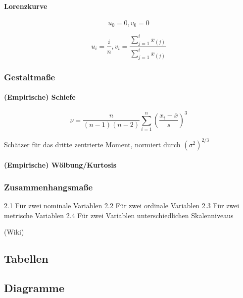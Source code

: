 \documentclass[10pt]{article}
\begin{document}
\begin{multicols}{2}

\paragraph{Lorenzkurve}

$$u_0=0, v_0=0$$

$$u_i=\frac{i}{n}, v_i= \frac{\sum\limits_{j=1}^i x_{(j)}}{\sum\limits_{j=1}^i x_{(j)}}$$


\end{multicols}


\subsubsection{Gestaltmaße}

\begin{multicols}{2}
\paragraph{(Empirische) Schiefe}

$$\nu = \frac{n}{(n-1)(n-2)} \sum_{i=1}^n \left(\frac{x_i-\bar{x}}{s}\right)^3$$

\noindent Schätzer für das dritte zentrierte Moment, normiert durch $(\sigma^2)^{2/3}$

\paragraph{(Empirische) Wölbung/Kurtosis}



\end{multicols}
\subsubsection{Zusammenhangsmaße}


    2.1 Für zwei nominale Variablen
    2.2 Für zwei ordinale Variablen
    2.3 Für zwei metrische Variablen
    2.4 Für zwei Variablen unterschiedlichen Skalenniveaus

(Wiki)

\subsection{Tabellen}

\subsection{Diagramme}
\end{document}
